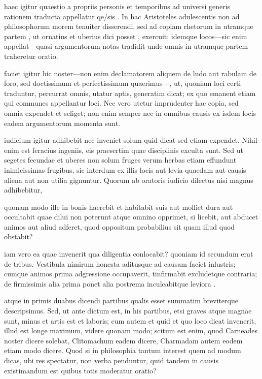  haec igitur quaestio a propriis personis et temporibus ad universi generis rationem traducta appellatur qe/sis . In hac Aristoteles adulescentis non ad philosophorum morem tenuiter disserendi, sed ad copiam rhetorum in utramque partem , ut ornatius et uberius dici posset , exercuit; idemque locos—sic enim appellat—quasi argumentorum notas tradidit unde omnis in utramque partem traheretur oratio.

 faciet igitur hic noster—non enim declamatorem aliquem de ludo aut rabulam de foro, sed doctissimum et perfectissimum quaerimus—, ut, quoniam loci certi traduntur, percurrat omnis, utatur aptis, generatim dicat; ex quo emanent etiam qui communes appellantur loci. Nec vero utetur imprudenter hac copia, sed omnia expendet et seliget; non enim semper nec in omnibus causis ex isdem locis eadem argumentorum momenta sunt.

 iudicium igitur adhibebit nec inveniet solum quid dicat sed etiam expendet. Nihil enim est feracius ingeniis, eis praesertim quae disciplinis exculta sunt. Sed ut segetes fecundae et uberes non solum fruges verum herbas etiam effundunt inimicissimas frugibus, sic interdum ex illis locis aut levia quaedam aut causis aliena aut non utilia gignuntur. Quorum ab oratoris iudicio dilectus nisi magnus adhibebitur,

 quonam modo ille in bonis haerebit et habitabit suis aut molliet dura aut occultabit quae dilui non poterunt atque omnino opprimet, si licebit, aut abducet animos aut aliud adferet, quod oppositum probabilius sit quam illud quod obstabit?

 iam vero ea quae invenerit qua diligentia conlocabit? quoniam id secundum erat de tribus. Vestibula nimirum honesta aditusque ad causam faciet inlustris; cumque animos prima adgressione occupaverit, tinfirmabit excludetque contraria; de firmissimis alia prima ponet alia postrema inculcabitque leviora .

 atque in primis duabus dicendi partibus qualis esset summatim breviterque descripsimus. Sed, ut ante dictum est, in his partibus, etsi graves atque magnae sunt, minus et artis est et laboris; cum autem et quid et quo loco dicat invenerit, illud est longe maximum, videre quonam modo; scitum est enim, quod Carneades noster dicere solebat, Clitomachum eadem dicere, Charmadam autem eodem etiam modo dicere. Quod si in philosophia tantum interest quem ad modum dicas, ubi res spectatur, non verba penduntur, quid tandem in causis existimandum est quibus totis moderatur oratio?

